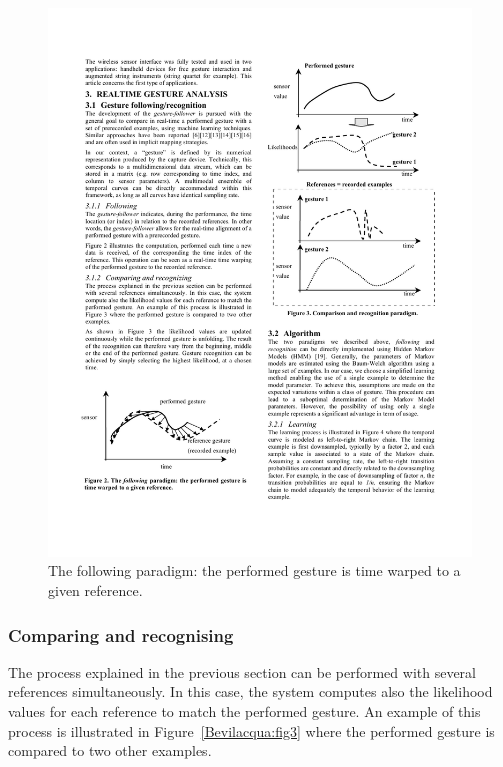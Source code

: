 \begin{figure}[t]
\center
\includegraphics[scale=1.1]{fig2.pdf}
%
%
\caption{The following paradigm: the performed gesture is time warped to a given reference.}
\label{Bevilacqua:fig2}       %
\end{figure}

\subsubsection{Comparing and recognising}
The process explained in the previous section can be performed with several references simultaneously. In this case, the system computes also the likelihood values for each reference to match the performed gesture. An example of this process is illustrated in Figure~\ref{Bevilacqua:fig3}  where the performed gesture is compared to two other examples. 

